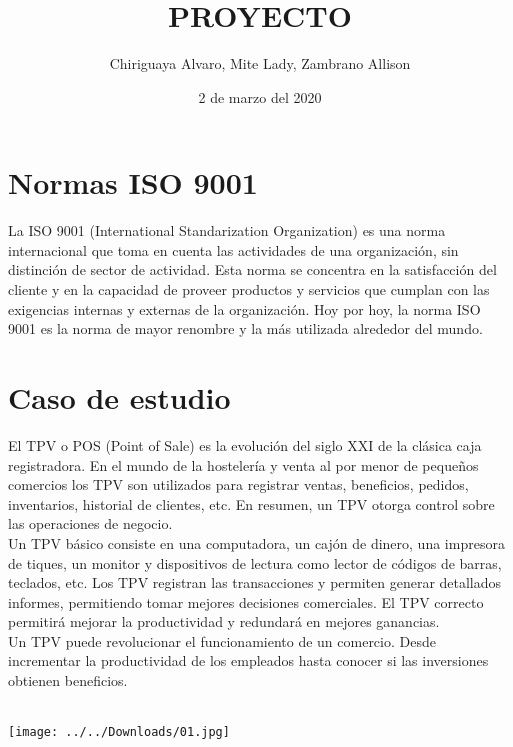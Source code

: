 \documentclass[12pt,a4paper]{article}
\title{PROYECTO}
\author{Chiriguaya Alvaro, Mite Lady, Zambrano Allison}
\date{2 de marzo del 2020}
\begin{document}
\maketitle

\section{Normas ISO 9001}
La ISO 9001 (International Standarization Organization) es una norma internacional que toma en cuenta las actividades de una organización, sin distinción de sector de actividad. Esta norma se concentra en la satisfacción del cliente y en la capacidad de proveer productos y servicios que cumplan con las exigencias internas y externas de la organización. Hoy por hoy, la norma ISO 9001 es la norma de mayor renombre y la más utilizada alrededor del mundo.

\section{Caso de estudio}
El TPV o POS (Point of Sale) es la evolución del siglo XXI de la clásica caja registradora. En el mundo de la hostelería y venta al por menor de pequeños comercios los TPV son utilizados para registrar ventas, beneficios, pedidos, inventarios, historial de clientes, etc. En resumen, un TPV otorga control sobre las operaciones de negocio.\\
Un TPV básico consiste en una computadora, un cajón de dinero, una impresora de tiques, un monitor y dispositivos de lectura como lector de códigos de barras, teclados, etc. Los TPV registran las transacciones y permiten generar detallados informes, permitiendo tomar mejores decisiones comerciales. El TPV correcto permitirá mejorar la productividad y redundará en mejores ganancias.\\
Un TPV puede revolucionar el funcionamiento de un comercio. Desde incrementar la productividad de los empleados hasta conocer si las inversiones obtienen beneficios.\\\\
\begin{center}
\texttt{[image: ../../Downloads/01.jpg]} 
\end{center}
\end{document}
